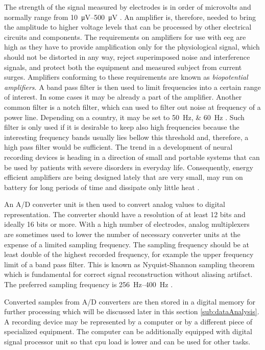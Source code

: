 The strength of the signal measured by electrodes is in order of microvolts and
normally range from \SIrange{10}{500}{\uV} \cite{neuralAmp}. An amplifier is,
therefore, needed to bring the amplitude to higher voltage levels that can be processed
by other electrical circuits and components. The requirements on amplifiers for
use with \gls{eeg} are high as they have to provide amplification only for the physiological
signal, which should not be distorted in any way, reject superimposed noise and
interference signals, and protect both the equipment and measured subject from
current surges. Amplifiers conforming to these requirements are known as
\emph{biopotential amplifiers}. \cite{biopotAmp}
A band pass filter is then used to limit frequencies into a certain range of
interest. In some cases it may be already a part of the amplifier.
Another common filter is a notch filter, which can used to filter out noise
at frequency of a power line. Depending on a country, it may be set to
\SIlist[list-units = single, list-pair-separator = { or }]{50;60}{\Hz}
\cite{deltaCompNREM}. Such filter is only used if it is desirable to keep also
high frequencies because the interesting frequency bands usually lies bellow this
threshold and, therefore, a high pass filter would be sufficient.
The trend in a development of neural recording devices is heading in a direction of
small and portable systems that can be used by patients with severe disorders in everyday life.
Consequently, energy efficient amplifiers are being designed lately that are very small, may run on battery for
long periods of time and dissipate only little heat \cite{neuralAmp}.

An A/D converter unit is then used to convert analog values to digital
representation. The converter should have a resolution of at least 12 bits and
ideally 16 bits or more. With a high number of electrodes, analog multiplexers are
sometimes used to lower the number of necessary converter units at the expense
of a limited sampling frequency. The sampling frequency should be at least double of
the highest recorded frequency, for example the upper frequency limit of a
band pass filter. This is known as Nyquist-Shannon sampling theorem which is
fundamental for correct signal reconstruction without aliasing artifact. The
preferred sampling frequency is \SIrange{256}{400}{\Hz} \cite{guidDigEEG}.

Converted samples from A/D converters are then stored in a digital memory for further
processing which will be discussed later in this section \ref{sub:dataAnalysis}.
A recording device may be represented by a computer or by a
different piece of specialized equipment. The computer can be additionally
equipped with digital signal processor unit so that \gls{cpu} load is lower and can be
used for other tasks.

